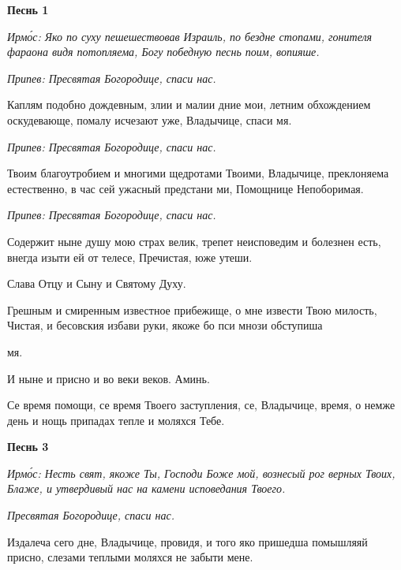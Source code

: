  

\bfseries Песнь 1\normalfont{}


 \itshape Ирмо́с:\normalfont{} Яко по суху пешешествовав Израиль, по бездне стопами, гонителя
фараона видя потопляема, Богу победную песнь поим, вопияше.



 \itshape Припев:\normalfont{} Пресвятая Богородице, спаси нас.



   Каплям подобно дождевным, злии и малии дние мои, летним
обхождением оскудевающе, помалу исчезают уже, Владычице, спаси
мя.



 \itshape Припев:\normalfont{} Пресвятая Богородице, спаси нас.



   Твоим благоутробием и многими щедротами Твоими, Владычице,
преклоняема естественно, в час сей ужасный предстани ми, Помощнице
Непоборимая.



 \itshape Припев:\normalfont{} Пресвятая Богородице, спаси нас.



   Содержит ныне душу мою страх велик, трепет неисповедим и болезнен
есть, внегда изыти ей от телесе, Пречистая, юже утеши.



   Слава Отцу и Сыну и Святому Духу.



   Грешным и смиренным известное прибежище, о мне извести Твою
милость, Чистая, и бесовския избави руки, якоже бо пси мнози обступиша

мя.



   И ныне и присно и во веки веков. Аминь.



   Се время помощи, се время Твоего заступления, се, Владычице, время, о
немже день и нощь припадах тепле и моляхся Тебе.



 

\bfseries Песнь 3\normalfont{}


 \itshape Ирмо́с:\normalfont{} Несть свят, якоже Ты, Господи Боже мой, вознесый рог верных Твоих,
Блаже, и утвердивый нас на камени исповедания Твоего.



 \itshape  Пресвятая Богородице, спаси нас.
\normalfont{}


   Издалеча сего дне, Владычице, провидя, и того яко пришедша
помышляяй присно, слезами теплыми моляхся не забыти мене.



